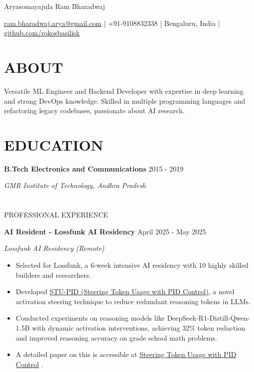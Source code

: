 \documentclass[fontsize=11pt]{article}
\newcommand{\MyName}[1]{
    \Huge \usefont{OT1}{phv}{b}{n} \hfill #1
    \par \normalsize \normalfont}
\newcommand{\NewPart}[1]{\section*{\uppercase{#1}}}
\newcommand{\EducationEntry}[4]{
    \noindent \textbf{#1} \hfill {#2} \par
    \noindent \textit{#3} \par
    \noindent \small #4
    \normalsize \par}
\newcommand{\WorkEntry}[4]{
    \noindent \textbf{#1} \hfill {#2} \par
    \noindent \textit{#3} \par
    \noindent \small #4
    \normalsize \par}
\newcommand{\AboutEntry}[1]{
    \noindent #1 \par}
\begin{document}
\MyName{Aryasomayajula Ram Bharadwaj}
\bigskip

{\small \hfill \href{mailto:ram.bharadwaj.arya@gmail.com}{ram.bharadwaj.arya@gmail.com} | +91-9108832338 | Bengaluru, India | \href{https://github.com/rokosbasilisk}{github.com/rokosbasilisk}}

\NewPart{ABOUT}
\AboutEntry{Versatile ML Engineer and Backend Developer with expertise in deep learning and strong DevOps knowledge. Skilled in multiple programming languages and refactoring legacy codebases, passionate about AI research.}

\NewPart{EDUCATION}
\EducationEntry
{B.Tech Electronics and Communications}
{2015 - 2019}
{GMR Institute of Technology, Andhra Pradesh}

\NewPart{PROFESSIONAL EXPERIENCE}
\WorkEntry
{AI Resident - Lossfunk AI Residency}
{April 2025 - May 2025}
{Lossfunk AI Residency (Remote)}
{%
\begin{itemize}
\item Selected for Lossfunk, a 6-week intensive AI residency with 10 highly skilled builders and researchers.
\item Developed \href{https://github.com/rokosbasilisk/STU-PID}{STU-PID (Steering Token Usage with PID Control)}, a novel activation steering technique to reduce redundant reasoning tokens in LLMs.
\item Conducted experiments on reasoning models like DeepSeek-R1-Distill-Qwen-1.5B with dynamic activation interventions, achieving 32\% token reduction and improved reasoning accuracy on grade school math problems.
\item A detailed paper on this is accessible at \href{https://arxiv.org/abs/2506.18831}{Steering Token Usage with PID Control} .
\end{itemize}}
\end{document}
